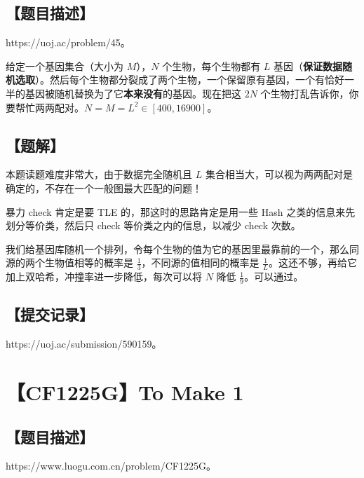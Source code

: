 \documentclass[UTF8,12pt,a4paper]{ctexart}
\begin{document}
	\subsection*{【题目描述】}
	
	https://uoj.ac/problem/45。
	
	给定一个基因集合（大小为 $M$），$N$ 个生物，每个生物都有 $L$ 基因（\textbf{保证数据随机选取}）。然后每个生物都分裂成了两个生物，一个保留原有基因，一个有恰好一半的基因被随机替换为了它\textbf{本来没有}的基因。现在把这 $2N$ 个生物打乱告诉你，你要帮忙两两配对。$N=M=L^2\in [400,16900]$。
	
	\subsection*{【题解】}
	
	本题读题难度非常大，由于数据完全随机且 $L$ 集合相当大，可以视为两两配对是确定的，不存在一个一般图最大匹配的问题！
	
	暴力 check 肯定是要 TLE 的，那这时的思路肯定是用一些 Hash 之类的信息来先划分等价类，然后只 check 等价类之内的信息，以减少 check 次数。
	
	我们给基因库随机一个排列，令每个生物的值为它的基因里最靠前的一个，那么同源的两个生物值相等的概率是 $\frac 13$，不同源的值相同的概率是 $\frac 1L$。这还不够，再给它加上双哈希，冲撞率进一步降低，每次可以将 $N$ 降低 $\frac 19$。可以通过。
	
	\subsection*{【提交记录】}
	
	https://uoj.ac/submission/590159。
	
	
	\section*{【CF1225G】To Make 1}
	
	\subsection*{【题目描述】}
	
	https://www.luogu.com.cn/problem/CF1225G。
	
\end{document}
